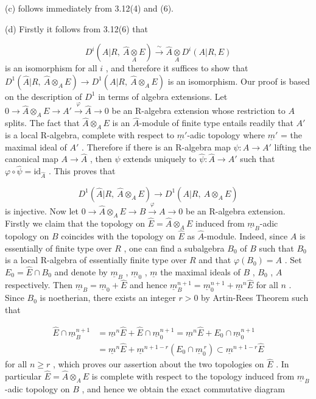 (c)  follows immediately from 3.12(4) and (6).

(d)  Firstly it follows from 3.12(6) that

\begin{equation*}
D^i(A|R, \ \hat{A}\underset{A}{\otimes}E) \xrightarrow{\ \sim\ } \hat{A}\underset{A}{\otimes}D^i(A|R, E)
\end{equation*}
is an isomorphism for all  $i$  , and therefore it suffices to show that
$D^1(\hat{A}|R,\ \hat{A}\otimes_A E) \to D^1(A|R,\ \hat{A}\otimes_A E)$  is an isomorphism. Our proof is based on the description of  $D^1$  in terms of algebra extensions. Let  $0 \to \hat{A}\otimes_A E \to A' \xrightarrow{\ \varphi\ } \hat{A} \to 0$  be an R-algebra extension whose restriction to $A$ splits. The fact that  $\hat{A}\otimes_A E$  is an $\hat{A}$-module of finite type entails readily that  $A'$  is a local R-algebra, complete with respect to $\underline{m}'$-adic topology where  $\underline{m}'$ = the maximal ideal of  $A'$ . Therefore if there is an R-algebra map  $\psi : A \to A'$  lifting the canonical map $A \to \hat{A}$ , then  $\psi$  extends uniquely to  $\hat{\psi} : \hat{A} \to A'$  such that  $\varphi \circ \hat{\psi} = \mathrm{id}_{\hat{A}}$ . This proves that

\begin{equation*}
D^1(\hat{A}|R,\ \hat{A}\otimes_A E) \to D^1(A|R,\ \hat{A}\otimes_A E)
\end{equation*}
is injective. Now let  $0 \to \hat{A}\otimes_A E \to B \xrightarrow{\ \varphi\ } A \to 0$  be an R-algebra extension. Firstly we claim that the topology on  $\hat{E} = \hat{A}\otimes_A E$  induced from  $\underline{m}_B$-adic topology on  $B$  coincides with the topology on  $\hat{E}$  as $\hat{A}$-module. Indeed, since  $A$  is essentially of finite type over  $R$ , one can find a subalgebra  $B_0$  of  $B$  such that  $B_0$  is a local R-algebra of essentially finite type over  $R$  and that  $\varphi(B_0) = A$ . Set  $E_0 = \hat{E} \cap B_0$  and denote by  $\underline{m}_B$ , $\underline{m}_0$ , $\underline{m}$  the maximal ideals of  $B$ , $B_0$ , $A$  respectively. Then  $\underline{m}_B = \underline{m}_0 + \hat{E}$  and hence  $\underline{m}_B^{n+1} = \underline{m}_0^{n+1} + \underline{m}^n\hat{E}$  for all  $n$ . Since  $B_0$  is noetherian, there exists an integer  $r > 0$  by Artin-Rees Theorem such that

\begin{equation*}
\begin{aligned}
\hat{E} \cap \underline{m}_B^{n+1} &= \underline{m}^n\hat{E} + \hat{E} \cap \underline{m}_0^{n+1} = \underline{m}^n\hat{E} + E_0 \cap \underline{m}_0^{n+1}\\
&= \underline{m}^n\hat{E} + \underline{m}^{n+1-r}(E_0 \cap \underline{m}_0^{\,r}) \subset \underline{m}^{n+1-r}\hat{E}
\end{aligned}
\end{equation*}
for all  $n \geq r$ , which proves our assertion about the two topologies on  $\hat{E}$  . In particular  $\hat{E} = \hat{A}\otimes_A E$  is complete with respect to the topology induced from $\underline{m}_B$-adic topology on  $B$ , and hence we obtain the exact commutative diagram

